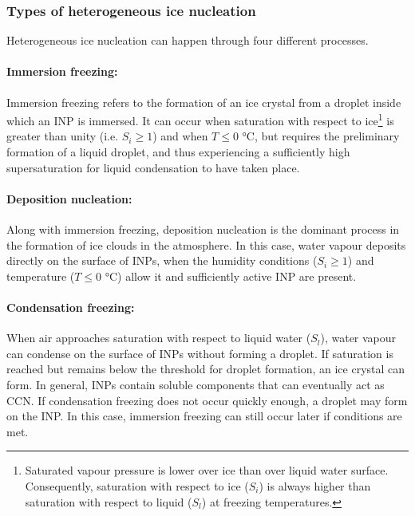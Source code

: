     \subsubsection{Types of heterogeneous ice nucleation}
        Heterogeneous ice nucleation can happen through four different processes.

        \paragraph{Immersion freezing:}
        Immersion freezing refers to the formation of an ice crystal from a droplet inside which an INP is immersed. It can occur when saturation with respect to ice\footnote{Saturated vapour pressure is lower over ice than over liquid water surface. Consequently, saturation with respect to ice ($S_i$) is always higher than saturation with respect to liquid ($S_l$) at freezing temperatures.} is greater than unity (i.e. $S_i \geq 1$) and when $T \leq 0$ \si{\degreeCelsius}, but requires the preliminary formation of a liquid droplet, and thus experiencing a sufficiently high supersaturation for liquid condensation to have taken place. %
        
        \paragraph{Deposition nucleation:}
        Along with immersion freezing, deposition nucleation is the dominant process in the formation of ice clouds in the atmosphere. In this case, water vapour deposits directly on the surface of INPs, when the humidity conditions ($S_i \geq 1$) and temperature ($T \leq 0$ \si{\degreeCelsius}) allow it and sufficiently active INP are present.
        
        \paragraph{Condensation freezing:}
        When air approaches saturation with respect to liquid water ($S_l$), water vapour can condense on the surface of INPs without forming a droplet. If saturation is reached but remains below the threshold for droplet formation, an ice crystal can form. In general, INPs contain soluble components that can eventually act as CCN. If condensation freezing does not occur quickly enough, a droplet may form on the INP. In this case, immersion freezing can still occur later if conditions are met.
        

